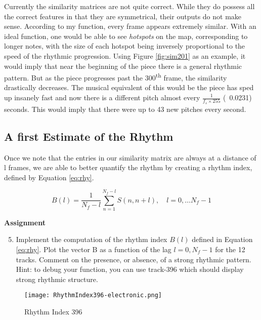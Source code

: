 \documentclass{article} %
\begin{document}
Currently the similarity matrices are not quite correct. While they do possess all the correct features in that they are symmetrical, their outputs do not make sense. 
According to my function, every frame appears extremely similar. With an ideal function, one would be able to see \emph{hotspots} on the map, corresponding to
longer notes, with the size of each hotspot being inversely proportional to the speed of the rhythmic progression. Using Figure \ref{fig:sim201} as an example, 
it would imply that near the beginning of the piece there is a general rhythmic pattern. But as the piece progresses past the 300\textsuperscript{th} frame, the similarity
drastically decreases. The musical equivalent of this would be the piece has sped up insanely fast and now there is a different pitch almost every $\frac{1}{f_s\times 255}$
(~0.0231) seconds. This would imply that there were up to 43 new pitches every second. 

\subsection{A first Estimate of the Rhythm}
Once we note that the entries in our similarity matrix are always at a distance of l frames, we are able to better quantify the rhythm by creating a rhythm index, defined
by Equation \ref{eq:rhy}.

\begin{equation}
\label{eq:rhy}
B(l)=\frac{1}{N_f-l} \sum\limits_{n=1}^{N_f-l}  S(n,n+l), \quad l=0,\dots N_f -1
\end{equation}

\begin{framed}
\textbf{Assignment}
\begin{enumerate}
\setcounter{enumi}{4}
\item Implement the computation of the rhythm index $B(l)$ defined in Equation \ref{eq:rhy}. Plot the vector B as a function of the lag $l=0,N_f -1$  for the 12 tracks. 
Comment on the presence, or absence, of a strong rhythmic pattern. \\
Hint: to debug your function, you can use track-396 which should display strong rhythmic structure. 
\end{enumerate}
\end{framed}

\begin{figure}[H]
\centering
\texttt{[image: RhythmIndex396-electronic.png]}
\caption{Rhythm Index 396}
\label{fig:rhy396}
\end{figure}
\end{document}
